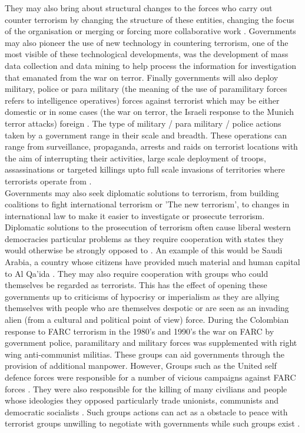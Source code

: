 They may also bring about structural changes to the forces who carry out counter terrorism by changing the structure of these entities, changing the focus of the organisation or merging or forcing more collaborative work \citep{jamwal2003counter}. Governments may also pioneer the use of new technology in countering terrorism, one of the most visible of these technological developments, was the development of mass data collection and data mining to help process the information for investigation that emanated from the war on terror. Finally governments will also deploy military, police or para military (the meaning of the use of paramilitary forces refers to intelligence operatives) forces against terrorist which may be either domestic or in some cases (the war on terror, the Israeli response to the Munich terror attacks) foreign \citep{calahan1995countering}. The type of military / para military / police actions taken by a government range in their scale and breadth. These operations can range from surveillance, propaganda, arrests and raids on terrorist locations with the aim of interrupting their activities, large scale deployment of troops, assassinations or targeted killings upto full scale invasions of territories where terrorists operate from \citep{conetta2002strange}. 
\\
Governments may also seek diplomatic solutions to terrorism, from building coalitions to fight international terrorism or 'The new terrorism', to changes in international law to make it easier to investigate or prosecute terrorism. Diplomatic solutions to the prosecution of terrorism often cause liberal western democracies particular problems as they require cooperation with states they would otherwise be strongly opposed to \citep{jarvis2014critical}. An example of this would be Saudi Arabia, a country whose citizens have provided much material and human capital to Al Qa'ida \citep{abuza2003funding}. They may also require cooperation with groups who could themselves be regarded as terrorists. This has the effect of opening these governments up to criticisms of hypocrisy or imperialism as they are allying themselves with people who are themselves despotic or are seen as an invading alien (from a cultural and political point of view) force. During the Colombian response to FARC terrorism in the 1980's and 1990's  the war on FARC by government police, paramilitary and military forces was supplemented with right wing anti-communist militias. These groups can aid governments through the provision of additional manpower. However, Groups such as the United self defence forces were responsible for a number of vicious campaigns against FARC forces \citep{ColombiaRightWingTerror}. They were also responsible for the killing of many civilians and people whose ideologies they opposed particularly trade unionists, communists and democratic socialists \citep{peceny2006farc}. Such groups actions can act as a obstacle to peace with terrorist groups unwilling to negotiate with governments while such groups exist \citep{ColombiaAUCFARC}.
